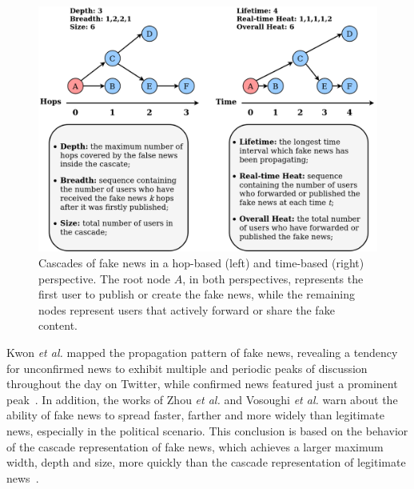 \documentclass{ieeeaccess}
\begin{document}

\begin{figure}
    \centering
    \includegraphics[width=\columnwidth]{../minicurso/cascata_hop_time.png}
    \caption{Cascades of fake news in a hop-based (left) and time-based (right) perspective. The root node $A$, in both perspectives, represents the first user to publish or create the fake news, while the remaining nodes represent users that actively forward or share the fake content.}
    \label{fig:cascata}
\end{figure}

Kwon {\it et al.} mapped the propagation pattern of fake news, revealing a tendency for unconfirmed news to exhibit multiple and periodic peaks of discussion throughout the day on Twitter, while confirmed news featured just a prominent peak~\cite{kwon2013prominent}. In addition, the works of Zhou \textit{et al.} and Vosoughi \textit{et al.} warn about the ability of fake news to spread faster, farther and more widely than legitimate news, especially in the political scenario. This conclusion is based on the behavior of the cascade representation of fake news, which achieves a larger maximum width, depth and size, more quickly than the cascade representation of legitimate news~\cite {zhou2015real, science-spread-fakenews}.
\end{document}
